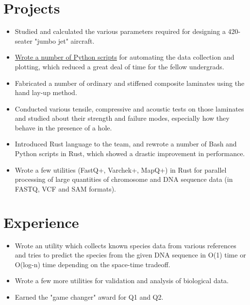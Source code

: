 \documentclass[11pt,a4paper,sans]{moderncv}        %
\newcommand\chref[3][linky]{\href{#2}{\color{#1}#3}}
\begin{document}
\section{Projects}
{\begin{itemize}
\item Studied and calculated the various parameters required for designing a 420-seater "jumbo jet" aircraft.
\item \chref{https://github.com/Wafflespeanut/scripts/tree/5610248de2d47311f128fecd015e2af8becca26f/python/Course}{Wrote a number of Python scripts} for automating the data collection and plotting, which reduced a great deal of time for the fellow undergrads.
\end{itemize}}
{\begin{itemize}
\item Fabricated a number of ordinary and stiffened composite laminates using the hand lay-up method.
\item Conducted various tensile, compressive and acoustic tests on those laminates and studied about their strength and failure modes, especially how they behave in the presence of a hole.
\end{itemize}}
{\begin{itemize}
\item Introduced Rust language to the team, and rewrote a number of Bash and Python scripts in Rust, which showed a drastic improvement in performance.
\item Wrote a few utilities (FastQ+, Varchek+, MapQ+) in Rust for parallel processing of large quantities of chromosome and DNA sequence data (in FASTQ, VCF and SAM formats).
\end{itemize}}

\section{Experience}
{\begin{itemize}
\item Wrote an utility which collects known species data from various references and tries to predict the species from the given DNA sequence in O(1) time or O(log-n) time depending on the space-time tradeoff.
\item Wrote a few more utilities for validation and analysis of biological data.
\item Earned the "game changer" award for Q1 and Q2.
\end{itemize}}
\end{document}
